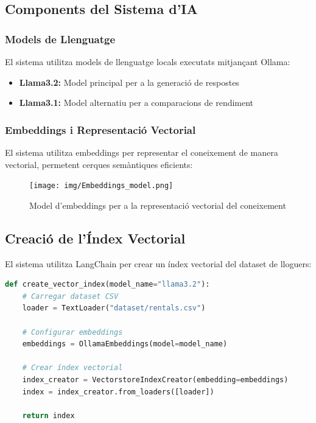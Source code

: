 \documentclass[12pt,a4paper]{article}
\begin{document}
\subsection{Components del Sistema d'IA}

\subsubsection{Models de Llenguatge}

El sistema utilitza models de llenguatge locals executats mitjançant Ollama:

\begin{itemize}
    \item \textbf{Llama3.2:} Model principal per a la generació de respostes
    \item \textbf{Llama3.1:} Model alternatiu per a comparacions de rendiment
\end{itemize}

\subsubsection{Embeddings i Representació Vectorial}

El sistema utilitza embeddings per representar el coneixement de manera vectorial, permetent cerques semàntiques eficients:

\begin{figure}[H]
\centering
\texttt{[image: img/Embeddings\_model.png]}
\caption{Model d'embeddings per a la representació vectorial del coneixement}
\end{figure}

\subsection{Creació de l'Índex Vectorial}

El sistema utilitza LangChain per crear un índex vectorial del dataset de lloguers:

\begin{lstlisting}[language=Python,caption=Creació de l'índex vectorial]
def create_vector_index(model_name="llama3.2"):
    # Carregar dataset CSV
    loader = TextLoader("dataset/rentals.csv")
    
    # Configurar embeddings
    embeddings = OllamaEmbeddings(model=model_name)
    
    # Crear índex vectorial
    index_creator = VectorstoreIndexCreator(embedding=embeddings)
    index = index_creator.from_loaders([loader])
    
    return index
\end{lstlisting}
\end{document}
